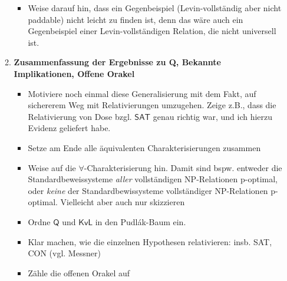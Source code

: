 \documentclass[nofonts]{uebung}
\begin{document}
\begin{enumerate}[label*=\arabic*.]
\begin{enumerate}[label*=\arabic*.]
\begin{itemize}
                \item Weise darauf hin, dass ein Gegenbeispiel (Levin-vollständig aber nicht paddable) nicht leicht zu finden ist, denn das wäre auch ein Gegenbeispiel einer Levin-vollständigen Relation, die nicht universell ist.
            \end{itemize}
            \item \textbf{Zusammenfassung der Ergebnisse zu Q, Bekannte Implikationen, Offene Orakel}
            \begin{itemize}
                \item Motiviere noch einmal diese Generalisierung mit dem Fakt, auf sichererem Weg mit Relativierungen umzugehen. Zeige z.B., dass die Relativierung von Dose bzgl. $\mathsf{SAT}$ genau richtig war, und ich hierzu Evidenz geliefert habe.
                \item Setze am Ende alle äquivalenten Charakterisierungen zusammen
                \item Weise auf die $\forall$-Charakterisierung hin. Damit sind bspw. entweder die Standardbeweissysteme \emph{aller} vollständigen NP-Relationen p-optimal, oder \emph{keine} der Standardbewissysteme vollständiger NP-Relationen p-optimal. Vielleicht aber auch nur skizzieren
                \item Ordne $\mathsf{Q}$ und $\mathsf{KvL}$ in den Pudlák-Baum ein.
                \item Klar machen, wie die einzelnen Hypothesen relativieren: insb. SAT, CON (vgl. Messner)
                \item Zähle die offenen Orakel auf
            \end{itemize}
        \end{enumerate}
\end{enumerate}
\end{document}
